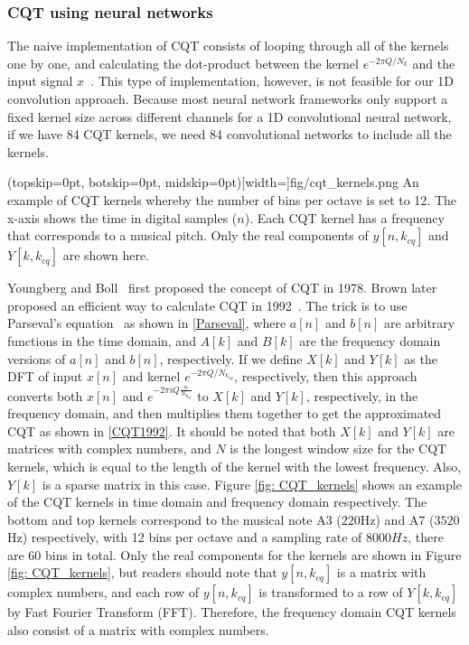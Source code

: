 \documentclass{ieeeaccess}
\begin{document}
\subsubsection{CQT using neural networks}
The naive implementation of CQT consists of looping through all of the kernels one by one, and calculating the dot-product between the kernel $e^{-2\pi Q/N_k}$ and the input signal $x$~\cite{brown1991calculation}. This type of implementation, however, is not feasible for our 1D convolution approach. Because most neural network frameworks only support a fixed kernel size across different channels for a 1D convolutional neural network, if we have 84 CQT kernels, we need 84 convolutional networks to include all the kernels.


\Figure[h](topskip=0pt, botskip=0pt, midskip=0pt)[width=\linewidth]{fig/cqt_kernels.png}
{An example of CQT kernels whereby the number of bins per octave is set to 12. The x-axis shows the time in digital samples ($n$). Each CQT kernel has a frequency that corresponds to a musical pitch. Only the real components of $y[n, k_{cq}]$ and $Y[k, k_{cq}]$ are shown here.  \label{fig: CQT_kernels}}

Youngberg and Boll~\cite{youngberg1978constant} first proposed the concept of CQT in 1978. Brown later proposed an efficient way to calculate CQT in 1992~\cite{brown1992efficient}. The trick is to use Parseval's equation~\cite{Oppenheim1989DiscretetimeSP} as shown in \eqref{Parseval}, where $a[n]$ and $b[n]$ are arbitrary functions in the time domain, and $A[k]$ and $B[k]$ are the frequency domain versions of $a[n]$ and $b[n]$, respectively. If we define $X[k]$ and $Y[k]$ as the DFT of input $x[n]$ and kernel $e^{-2\pi Q/N_{k_{cq}}}$, respectively, then this approach converts both $x[n]$ and $e^{-2\pi iQ\frac{n}{N_{k_{cq}}}}$ to $X[k]$ and $Y[k]$, respectively, in the frequency domain, and then multiplies them together to get the approximated CQT as shown in \eqref{CQT1992}. It should be noted that both $X[k]$ and $Y[k]$ are  matrices with complex numbers, and $N$ is the longest window size for the CQT kernels, which is equal to the length of the kernel with the lowest frequency. Also, $Y[k]$ is a sparse matrix in this case. Figure \ref{fig: CQT_kernels} shows an example of the CQT kernels in time domain and frequency domain respectively. The bottom and top kernels correspond to the musical note A3 ($220$Hz) and A7 ($3520$Hz) respectively, with 12 bins per octave and a sampling rate of $8000Hz$, there are 60 bins in total. Only the real components for the kernels are shown in Figure \ref{fig: CQT_kernels}, but readers should note that $y[n,k_{cq}]$ is a matrix with complex numbers, and each row of $y[n,k_{cq}]$ is transformed to a row of $Y[k,k_{cq}]$ by Fast Fourier Transform (FFT). Therefore, the frequency domain CQT kernels also consist of a matrix with complex numbers.
\end{document}
